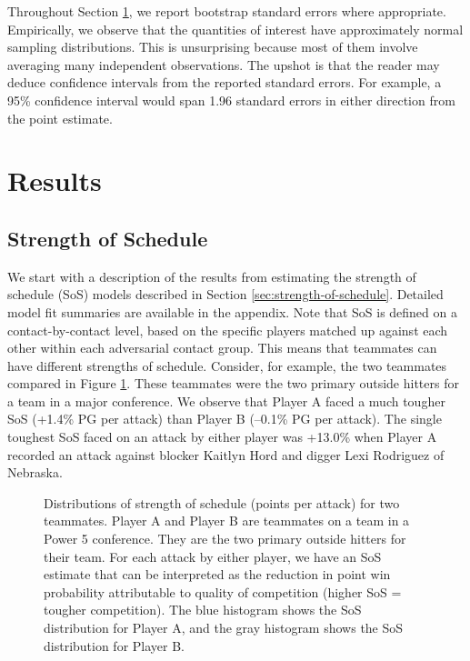 \documentclass[USenglish]{article}
\theoremstyle{dgthm}
\theoremstyle{dgdef}
\begin{document}
Throughout Section \ref{sec:results}, we report bootstrap standard errors where appropriate. Empirically, we observe that the quantities of interest have approximately normal sampling distributions. This is unsurprising because most of them involve averaging many independent observations. The upshot is that the reader may deduce confidence intervals from the reported standard errors. For example, a 95\% confidence interval would span 1.96 standard errors in either direction from the point estimate.

\section{Results}
\label{sec:results}

\subsection{Strength of Schedule}

We start with a description of the results from estimating the strength of schedule (SoS) models described in Section \ref{sec:strength-of-schedule}. Detailed model fit summaries are available in the appendix. Note that SoS is defined on a contact-by-contact level, based on the specific players matched up against each other within each adversarial contact group. This means that teammates can have different strengths of schedule. Consider, for example, the two teammates compared in Figure \ref{fig:teammate-comparison}. These teammates were the two primary outside hitters for a team in a major conference. We observe that Player A faced a much tougher SoS (+1.4\% PG per attack) than Player B (--0.1\% PG per attack). The single toughest SoS faced on an attack by either player was +13.0\% when Player A recorded an attack against blocker Kaitlyn Hord and digger Lexi Rodriguez of Nebraska.

\begin{figure}
    \centering
    \caption{Distributions of strength of schedule (points per attack) for two teammates. Player A and Player B are teammates on a team in a Power 5 conference. They are the two primary outside hitters for their team. For each attack by either player, we have an SoS estimate that can be interpreted as the reduction in point win probability attributable to quality of competition (higher SoS = tougher competition). The blue histogram shows the SoS distribution for Player A, and the gray histogram shows the SoS distribution for Player B.}
    \label{fig:teammate-comparison}
\end{figure}
\end{document}
